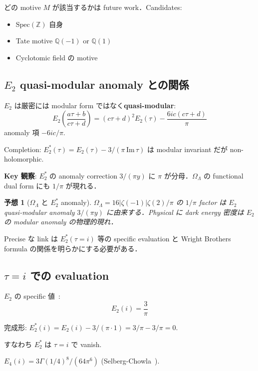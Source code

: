\documentclass[11pt,a4paper]{article}
\newtheorem{conjecture}{予想}
\begin{document}
どの motive $M$ が該当するかは future work．Candidates:
\begin{itemize}
\item $\text{Spec}(\mathbb{Z})$ 自身
\item Tate motive $\mathbb{Q}(-1)$ or $\mathbb{Q}(1)$
\item Cyclotomic field の motive
\end{itemize}

\subsection{$E_2$ quasi-modular anomaly との関係}

$E_2$ は厳密には modular form ではなく\textbf{quasi-modular}:
\begin{equation}
E_2\left(\frac{a\tau + b}{c\tau + d}\right) = (c\tau + d)^2 E_2(\tau) - \frac{6ic(c\tau + d)}{\pi}
\end{equation}
anomaly 項 $-6ic/\pi$.

Completion: $E_2^*(\tau) = E_2(\tau) - 3/(\pi\,\text{Im}\,\tau)$ は
modular invariant だが non-holomorphic.

\textbf{Key 観察}: $E_2^*$ の anomaly correction $3/(\pi y)$ に $\pi$
が分母．$\Omega_\Lambda$ の functional dual form にも $1/\pi$ が現れる．

\begin{conjecture}[$\Omega_\Lambda$ と $E_2^*$ anomaly]
$\Omega_\Lambda = 16|\zeta(-1)|\zeta(2)/\pi$ の $1/\pi$ factor は
$E_2$ quasi-modular anomaly $3/(\pi y)$ に由来する．Physical に
dark energy 密度は $E_2$ の modular anomaly の物理的現れ．
\end{conjecture}

Precise な link は $E_2^*(\tau = i)$ 等の specific evaluation と
Wright Brothers formula の関係を明らかにする必要がある．

\subsection{$\tau = i$ での evaluation}

$E_2$ の specific 値~\cite{Serre1973}:
\begin{equation}
E_2(i) = \frac{3}{\pi}
\end{equation}

完成形: $E_2^*(i) = E_2(i) - 3/(\pi \cdot 1) = 3/\pi - 3/\pi = 0$.

すなわち $E_2^*$ は $\tau = i$ で vanish.

$E_4(i) = 3\Gamma(1/4)^8/(64\pi^6)$ (Selberg-Chowla~\cite{Chowla1967}).
\end{document}
